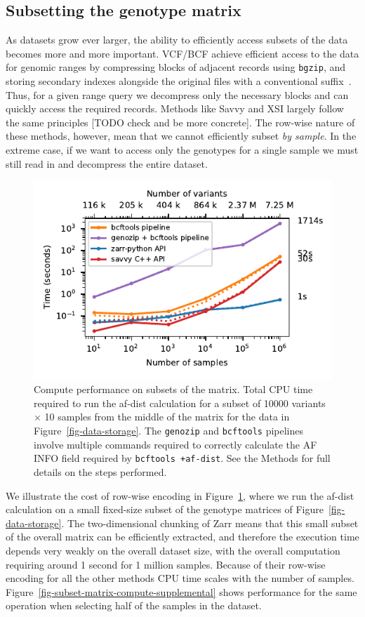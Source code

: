 \documentclass[a4paper,num-refs]{oup-contemporary}
\begin{document}
\subsection{Subsetting the genotype matrix}
As datasets grow ever larger, the ability to efficiently access subsets 
of the data becomes more and more important. VCF/BCF achieve efficient 
access to the data for genomic ranges 
by compressing blocks of adjacent records using \texttt{bgzip},
and storing secondary indexes alongside the original 
files with a conventional suffix~\citep{li2011tabix}. 
Thus, for a given range query we 
decompress only the necessary blocks and can quickly access
the required records. 
Methods like Savvy and XSI largely follow the same principles [TODO check and 
be more concrete]. The row-wise nature of these methods, however, mean 
that we cannot efficiently subset \emph{by sample}. In the extreme
case, if we want to access only the genotypes for a single sample
we must still read in and decompress the entire dataset.

\begin{figure}
\includegraphics{figures/subset-matrix-compute}
\caption{Compute performance on subsets of the matrix.
Total CPU time required to run the af-dist calculation for
a subset of 10000 variants $\times$ 10 samples from the middle of the matrix
for the data in Figure~\ref{fig-data-storage}.
The \texttt{genozip} and \texttt{bcftools} pipelines involve
multiple commands required to correctly calculate the AF INFO field
required by \texttt{bcftools +af-dist}. See the Methods for full details
on the steps performed.
\label{fig-subset-matrix-compute}}
\end{figure}

We illustrate the cost of row-wise encoding in
Figure~\ref{fig-subset-matrix-compute}, where we run the af-dist calculation
on a small fixed-size subset of the genotype matrices of
Figure~\ref{fig-data-storage}. The two-dimensional chunking of Zarr
means that this small subset of the overall matrix can be efficiently
extracted, and therefore the execution time depends very weakly on 
the overall dataset size, with the overall computation requiring around
1 second for 1 million samples. Because of their 
row-wise encoding for all the other methods CPU time
scales with the number of samples.
Figure~\ref{fig-subset-matrix-compute-supplemental} shows performance
for the same operation when selecting half of the samples in the 
dataset.
\end{document}
